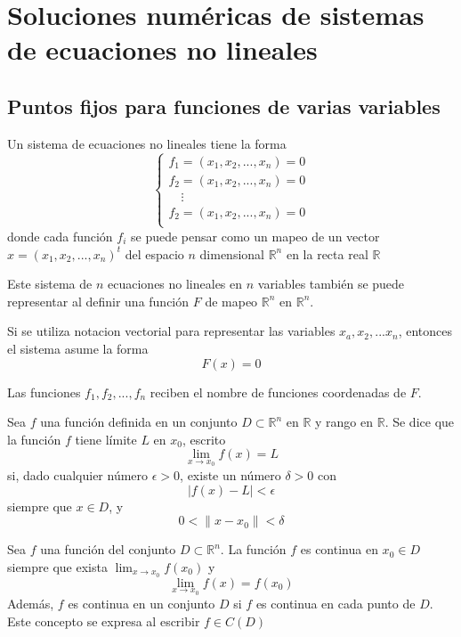 \section{Soluciones numéricas de sistemas de ecuaciones no lineales}

\subsection{Puntos fijos para funciones de varias variables}

Un sistema de ecuaciones no lineales tiene la forma
\begin{equation}
    \begin{cases}
        f_1 = (x_1 , x_2, ... , x_n) = 0 \\
        f_2 = (x_1 , x_2, ... , x_n) = 0 \\
        \quad \vdots \\
        f_2 = (x_1 , x_2, ... , x_n) = 0 \\
    \end{cases}
\end{equation}
donde cada función $f_i$ se puede pensar como un mapeo de un vector $x = (x_1, x_2, ..., x_n)^t$ del espacio $n$ dimensional $\mathbb{R}^n$ en la recta real $\mathbb{R}$

Este sistema de $n$ ecuaciones no lineales en $n$ variables también se puede representar al definir una función $F$ de mapeo $\mathbb{R}^n$ en $\mathbb{R}^n$.

Si se utiliza notacion vectorial para representar las variables $x_a, x_2, ...x_n$, entonces el sistema asume la forma
\begin{equation}
    F(x) = 0
\end{equation}

Las funciones $f_1, f_2, ..., f_n$ reciben el nombre de funciones coordenadas de $F$.

\begin{definition}
    Sea $f$ una función definida en un conjunto $D \subset \mathbb{R}^n$ en $\mathbb{R}$ y rango en $\mathbb{R}$. Se dice que la función $f$ tiene límite $L$ en $x_0$, escrito
    \[ \lim_{x \rightarrow x_0} f(x) = L \]
    si, dado cualquier número $\epsilon > 0$, existe un número $\delta > 0$ con
    \[ |f(x) - L| < \epsilon \]
    siempre que $x \in D$, y
    \[ 0 < \| x - x_0 \| < \delta \]
\end{definition}

\begin{definition}
    Sea $f$ una función del conjunto $D \subset \mathbb{R}^n$. La función $f$ es continua en $x_0 \in D$ siempre que exista $\lim_{x \rightarrow x_0} f(x_0)$ y 
    \[ \lim_{x \rightarrow x_0} f(x) = f(x_0) \]
    Además, $f$ es continua en un conjunto $D$ si $f$ es continua en cada punto de $D$. Este concepto se expresa al escribir $f \in C(D)$
\end{definition}

